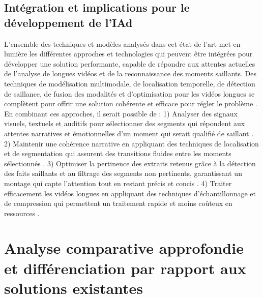 \subsection{Intégration et implications pour le développement de l'IAd}
L’ensemble des techniques et modèles analysés dans cet état de l’art met en lumière les différentes approches et technologies qui peuvent être intégrées pour développer une solution performante, capable de répondre aux attentes actuelles de l’analyse de longues vidéos et de la reconnaissance des moments saillants. Des techniques de modélisation multimodale, de localisation temporelle, de détection de saillance, de fusion des modalités et d’optimisation pour les vidéos longues se complètent pour offrir une solution cohérente et efficace pour régler le problème \cite{zhou2024}\cite{li2024}\cite{huang2024_vtimellm}\cite{xu2024}\cite{weng2024}. En combinant ces approches, il serait possible de : 
1) Analyser des signaux visuels, textuels et auditifs pour sélectionner des segments qui répondent aux attentes narratives et émotionnelles d’un moment qui serait qualifié de saillant \cite{chen2023}\cite{munasinghe2023_pgvideo}. 
2) Maintenir une cohérence narrative en appliquant des techniques de localisation et de segmentation qui assurent des transitions fluides entre les moments sélectionnés \cite{wang2024_hawkeye}\cite{guo2024_vtgllm}. 
3) Optimiser la pertinence des extraits retenus grâce à la détection des faits saillants et au filtrage des segments non pertinents, garantissant un montage qui capte l’attention tout en restant précis et concis \cite{you2023_ferret}\cite{han2024_clip}. 
4) Traiter efficacement les vidéos longues en appliquant des techniques d’échantillonnage et de compression qui permettent un traitement rapide et moins coûteux en ressources \cite{weng2024}\cite{lei2021_clipbert}.

\section{Analyse comparative approfondie et différenciation par rapport aux solutions existantes}

